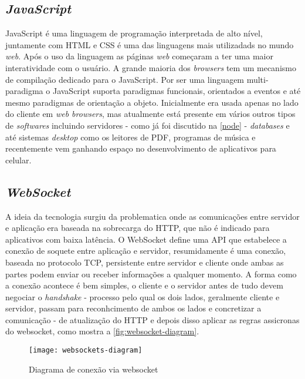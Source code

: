 \subsection[\textit{JavaScript}]{\textit{JavaScript}}\label{js}
JavaScript é uma linguagem de programação interpretada de alto nível, juntamente com HTML e CSS é uma das linguagens mais utilizadads no mundo \textit{web}.
Após o uso da linguagem as páginas \textit{web} começaram a ter uma maior interatividade com o usuário. A grande maioria dos \textit{browsers} tem um
mecanismo de compilação dedicado para o JavaScript. Por ser uma linguagem multi-paradigma o JavaScript suporta paradigmas funcionais, orientados a eventos 
e até mesmo paradigmas de orientação a objeto.
Inicialmente era usada apenas no lado do cliente em \textit{web browsers}, mas atualmente está presente em vários outros tipos de \textit{softwares} incluindo
servidores - como já foi discutido na \autoref{node} - \textit{databases} e até sistemas \textit{desktop} como os leitores de PDF, programas de música e recentemente
vem ganhando espaço no desenvolvimento de aplicativos para celular.

\subsection[\textit{WebSocket}]{\textit{WebSocket}}\label{websocket}
A ideia da tecnologia surgiu da problematica onde as comunicações entre servidor e aplicação era baseada na sobrecarga do HTTP, que não é indicado para aplicativos
com baixa latência. O WebSocket define uma API que estabelece a conexão de soquete entre aplicação e servidor, resumidamente é uma conexão, baseada no protocolo TCP, persistente
entre servidor e cliente onde ambas as partes podem enviar ou receber informações a qualquer momento. A forma como a conexão acontece é bem simples,
o cliente e o servidor antes de tudo devem negociar o \textit{handshake} - processo pelo qual os dois lados, geralmente cliente e servidor, passam para
reconhcimento de ambos os lados e concretizar a comunicação - de atualização do HTTP e depois disso aplicar as regras assicronas do websocket, como mostra
a \autoref{fig:websocket-diagram}.

\begin{figure}[h!]
	\texttt{[image: websockets-diagram]}
	\centering
	\caption[Diagrama de conexão via websocket]{Diagrama de conexão via websocket}
	\label{fig:websocket-diagram}
\end{figure}
\FloatBarrier



